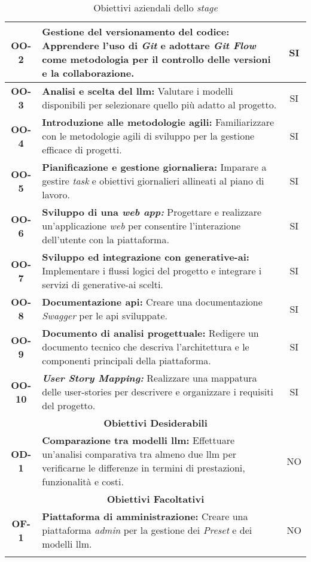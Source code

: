 \begin{longtable}{|c|>{\centering\arraybackslash}p{}|c|}
    \hline
    \textbf{OO-2} & \textbf{Gestione del versionamento del codice:} Apprendere l'uso di \textit{Git} e adottare \textit{Git Flow} come metodologia per il controllo delle versioni e la collaborazione. & SI\\
    \hline
    \textbf{OO-3} & \textbf{Analisi e scelta del \gls{llm}:} Valutare i modelli disponibili per selezionare quello più adatto al progetto.& SI \\
    \hline
    \textbf{OO-4} & \textbf{Introduzione alle metodologie agili:} Familiarizzare con le metodologie agili di sviluppo per la gestione efficace di progetti. & SI\\
    \hline
    \textbf{OO-5} & \textbf{Pianificazione e gestione giornaliera:} Imparare a gestire \textit{task} e obiettivi giornalieri allineati al piano di lavoro. & SI\\
    \hline
    \textbf{OO-6} & \textbf{Sviluppo di una \textit{web app:}} Progettare e realizzare un'applicazione \textit{web} per consentire l'interazione dell'utente con la piattaforma. & SI\\
    \hline
    \textbf{OO-7} & \textbf{Sviluppo ed integrazione con \gls{generative-ai}:} Implementare i flussi logici del progetto e integrare i servizi di \gls{generative-ai} scelti. & SI\\
    \hline
    \textbf{OO-8} & \textbf{Documentazione \gls{api}:} Creare una documentazione \textit{Swagger} per le \gls{api} sviluppate.& SI \\
    \hline
    \textbf{OO-9} & \textbf{Documento di analisi progettuale:} Redigere un documento tecnico che descriva l'architettura e le componenti principali della piattaforma.& SI \\
    \hline
    \textbf{OO-10} & \textbf{\textit{User Story Mapping:}} Realizzare una mappatura delle \gls{user-stories} per descrivere e organizzare i requisiti del progetto.& SI \\
    \hline
    \multicolumn{3}{|c|}{\rowcolor{green!30} \textbf{Obiettivi Desiderabili}} \\
    \hline %
    \textbf{OD-1} & \textbf{Comparazione tra modelli \gls{llm}:} Effettuare un'analisi comparativa tra almeno due \gls{llm} per verificarne le differenze in termini di prestazioni, funzionalità e costi.& NO \\
    \hline
    \multicolumn{3}{|c|}{\rowcolor{green!30} \textbf{Obiettivi Facoltativi}} \\
    \noalign{\hrule} %
    \textbf{OF-1} & \textbf{Piattaforma di amministrazione:} Creare una piattaforma \textit{admin} per la gestione dei \textit{Preset} e dei modelli \gls{llm}.& NO \\
    \hline
    \caption{Obiettivi aziendali dello \textit{stage}} %
    \label{tab:raggiungimento_obiettivi_stage} %
\end{longtable}

